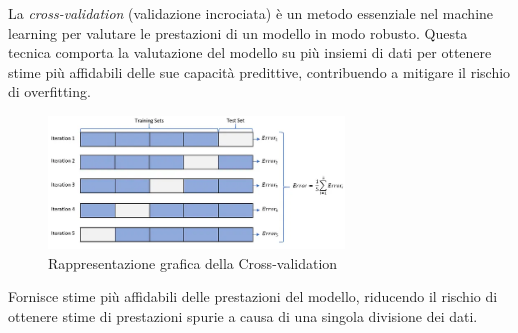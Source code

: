 La \textit{cross-validation} (validazione incrociata) è un metodo essenziale nel machine learning
per valutare le prestazioni di un modello in modo robusto. Questa tecnica comporta la valutazione
del modello su più insiemi di dati per ottenere stime più affidabili delle sue capacità predittive,
contribuendo a mitigare il rischio di overfitting.

\begin{figure}[!ht]
	\centering
	\includegraphics[width=0.7\textwidth]{Immagini/cross_validation.png}
	\caption{Rappresentazione grafica della Cross-validation}
	\label{fig:cross_validation}
\end{figure}

Fornisce stime più affidabili delle prestazioni del modello, riducendo il
rischio di ottenere stime di prestazioni spurie a causa di una singola
divisione dei dati.
